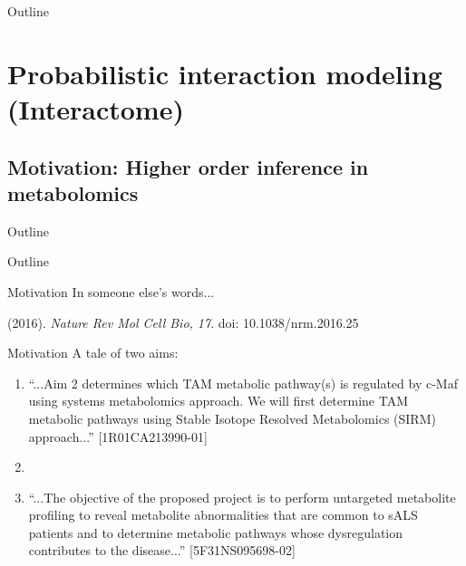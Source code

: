 \documentclass[xcolor=dvipsnames]{beamer}
\begin{document}
\begin{frame}{Outline}
	\vspace{-10.5pt}
	\tableofcontents[hideallsubsections]
\end{frame}

\section{Probabilistic interaction modeling (Interactome)}
\subsection{Motivation: Higher order inference in metabolomics}
\begin{frame}{Outline}
	\vspace{-10.5pt}
	\tableofcontents[currentsection,subsectionstyle=hide]
\end{frame}

\begin{frame}{Outline}
	\vspace{-10.5pt}
	\tableofcontents[currentsection,subsectionstyle=show/shaded/hide]
\end{frame}

\begin{frame}{Motivation}
	\vspace{-15.5pt}
	{\LARGE In someone else's words...}
	\begin{center}
	\end{center}
	(2016). \emph{Nature Rev Mol Cell Bio, 17}. doi: 10.1038/nrm.2016.25
\end{frame}

\begin{frame}{Motivation}
	\vspace{-10pt}
		{\LARGE A tale of two aims:}
		
		\begin{enumerate}[{1)}]
			\item ``...Aim 2 determines which TAM metabolic pathway(s) is regulated by c-Maf using systems metabolomics approach. We will first determine TAM metabolic pathways using Stable Isotope Resolved Metabolomics (SIRM) approach...'' [1R01CA213990-01]
			\item[]
			\item ``...The objective of the proposed project is to perform untargeted metabolite profiling to reveal metabolite abnormalities that are common to sALS patients and to determine metabolic pathways whose dysregulation contributes to the disease...'' [5F31NS095698-02]
		\end{enumerate}
\end{frame}
\end{document}
